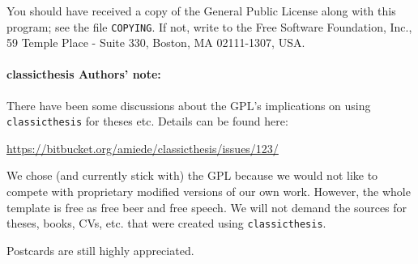 You should have received a copy of the  General
Public License
along with this program; see the file \texttt{COPYING}.  If not,
write to
the Free Software Foundation, Inc., 59 Temple Place - Suite 330,
Boston, MA 02111-1307, USA.

\paragraph{classicthesis Authors' note:} There have been some discussions about the GPL's implications on using \texttt{classicthesis} for theses etc. Details can be found here:
\begin{center}
  \url{https://bitbucket.org/amiede/classicthesis/issues/123/}
\end{center}

We chose (and currently stick with) the GPL because we would not like to compete with proprietary modified versions of our own work. However, the whole template is free as free beer and free speech. We will not demand the sources for theses, books, CVs, etc. that were created using \texttt{classicthesis}.

Postcards are still highly appreciated.





